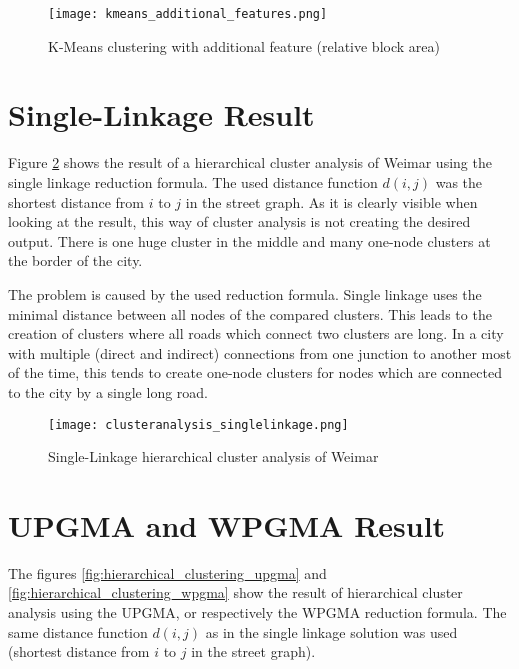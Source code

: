 \begin{figure}
    \centering
    \begin{mdframed}[style=mdthight]
        \texttt{[image: kmeans\_additional\_features.png]}
    \end{mdframed}
    \caption{K-Means clustering with additional feature (relative block area) \label{fig:kmeans_additional_features}}
\end{figure}

\pagebreak
\section{Single-Linkage Result}
Figure \ref{fig:SingleLinkage} shows the result of a hierarchical cluster analysis of Weimar using the single linkage reduction formula. The used distance function $d(i, j)$ was the shortest distance from $i$ to $j$ in the street graph. As it is clearly visible when looking at the result, this way of cluster analysis is not creating the desired output. There is one huge cluster in the middle and many one-node clusters at the border of the city.

The problem is caused by the used reduction formula. Single linkage uses the minimal distance between all nodes of the compared clusters. This leads to the creation of clusters where all roads which connect two clusters are long. In a city with multiple (direct and indirect) connections from one junction to another most of the time, this tends to create one-node clusters for nodes which are connected to the city by a single long road.

\begin{figure}
    \centering
    \begin{mdframed}[style=mdthight, userdefinedwidth=0.7\textwidth, align=center]
        \texttt{[image: clusteranalysis\_singlelinkage.png]}
    \end{mdframed}
    \caption{Single-Linkage hierarchical cluster analysis of Weimar\label{fig:SingleLinkage}}
\end{figure}

\pagebreak
\section{UPGMA and WPGMA Result}
\label{sec:UPGMAandWPGMA}
The figures \ref{fig:hierarchical_clustering_upgma} and \ref{fig:hierarchical_clustering_wpgma} show the result of hierarchical cluster analysis using the \acrshort{UPGMA}, or respectively the \acrshort{WPGMA} reduction formula. The same distance function $d(i, j)$ as in the single linkage solution was used (shortest distance from $i$ to $j$ in the street graph).

